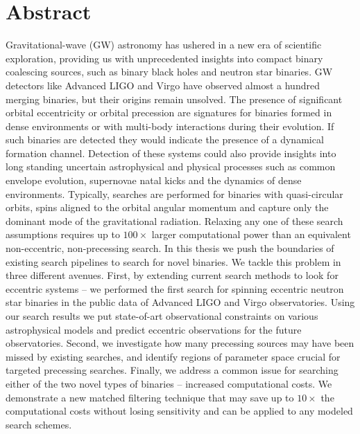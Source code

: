 \chapter{Abstract}
\vspace*{-0.75cm}
Gravitational-wave (GW) astronomy has ushered in a new era of scientific exploration, providing us with unprecedented insights into compact binary coalescing sources, such as binary black holes and neutron star binaries. GW detectors like Advanced LIGO and Virgo have observed almost a hundred merging binaries, but their origins remain unsolved. The presence of significant orbital eccentricity or orbital precession are signatures for binaries formed in dense environments or with multi-body interactions during their evolution. If such binaries are detected they would indicate the presence of a dynamical formation channel. Detection of these systems could also provide insights into long standing uncertain astrophysical and physical processes such as common envelope evolution, supernovae natal kicks and the dynamics of dense environments. Typically, searches are performed for binaries with quasi-circular orbits, spins aligned to the orbital angular momentum and capture only the dominant mode of the gravitational radiation. Relaxing any one of these search assumptions requires up to $100\times$ larger computational power than an equivalent non-eccentric, non-precessing search. In this thesis we push the boundaries of existing search pipelines to search for novel binaries. We tackle this problem in three different avenues. First, by extending current search methods to look for eccentric systems -- we performed the first search for spinning eccentric neutron star binaries in the public data of Advanced LIGO and Virgo observatories. Using our search results we put state-of-art observational constraints on various astrophysical models and predict eccentric observations for the future observatories. Second, we investigate how many precessing sources may have been missed by existing searches, and identify regions of parameter space crucial for targeted precessing searches. Finally, we address a common issue for searching either of the two novel types of binaries -- increased computational costs. We demonstrate a new matched filtering technique that may save up to $10\times$ the computational costs without losing sensitivity and can be applied to any modeled search schemes.    




